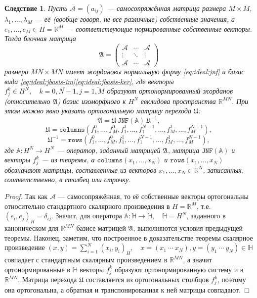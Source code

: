 \documentclass{article}
\newtheorem{corollary}{Следствие }
\begin{document}
 \begin{corollary}
     Пусть \( \mathcal{A} = (a_{ij}) \) --- самосопряжённая матрица размера \( M\times M \),
     \( \lambda_1, \ldots, \lambda_M \) --- её (вообще говоря, не все различные) собственные значения,
     а \( e_1, \ldots, e_M \in H=\mathbb{R}^M \) --- соответствующие нормированные собственные векторы.
     Тогда блочная матрица
     \[ \mathfrak{A} = \begin{pmatrix}
         \mathcal{A} & \cdots & \mathcal{A} \\
         \vdots & \ddots & \vdots \\
         \mathcal{A} & \cdots & \mathcal{A}
     \end{pmatrix} \]
     размера \( MN\times MN \) имеет жордановы нормальную форму \eqref{eq:ideal:jnf}
     и базис вида \eqref{eq:ideal:jbasis-im}\eqref{eq:ideal:jbasis-ker},
     где векторы \( f_j^k\in H^N,\quad k=\overline{0,N-1},j=\overline{1,M} \)
     образуют ортонормированный жорданов (относительно \( \mathfrak{A} \))
     базис изоморфного к \( H^N \) евклидова пространства \( \mathbb{R}^{MN} \).
     При этом можно явно указать ортогональную матрицу перехода \( \mathfrak{U} \):
     \[
         \mathfrak{A} = \mathfrak{U} ~ \mathtt{JNF}(\mathbb{A}) ~ \mathfrak{U}^{-1}, \]
    \[ \mathfrak{U} = \mathtt{columns}(f_1^0,\ldots,f_M^0,f_1^1,\ldots,f_1^{N-1},\ldots,f_M^1,\ldots,f_M^{N-1}), \]
    \[ \mathfrak{U}^{-1} = \mathtt{rows}(f_1^0,\ldots,f_M^0,f_1^1,\ldots,f_1^{N-1},\ldots,f_M^1,\ldots,f_M^{N-1}), \]
     где \( \mathbb{A}:H^N\to H^N \) --- оператор, заданный матрицей \( \mathfrak{A} \),
     матрица \( \mathtt{JNF(\mathbb{A})} \) и векторы \( f_j^k \) --- из теоремы,
     а \( \mathtt{columns}(x_1,\ldots,x_N) \) и \( \mathtt{rows}(x_1,\ldots,x_N) \) обозначают матрицы,
     составленные из векторов \( x_1, \ldots, x_N \in \mathbb{R}^N \),
     записанных, соответственно, в столбец или строчку.
 \end{corollary}
 \begin{proof}
     Так как \( \mathcal{A} \) --- самосопряжённая,
     то её собственные векторы ортогональны относительно стандартного скалярного произведения в \( H=\mathbb{R}^M \),
     т.е. \( (e_i, e_j)_H = \delta_{ij} \).
     Значит, для оператора \( \mathbb{A}:\mathbb{H}\to\mathbb{H}, \quad \mathbb{H}=H^N \),
     заданного в каноническом для \( \mathbb{R}^{MN} \) базисе матрицей \( \mathfrak{A} \),
     выполняются условия предыдущей теоремы.
     Наконец, заметим, что построенное в доказательстве теоремы
     скалярное произведение \( (x,y) = \sum_{i=1}^N (x_i, y_i)_H, \quad x=(x_1~\cdots~x_N),y=(y_1~\cdots~y_N)\in\mathbb{H} \)
     совпадает с стандартным скалярным произведением в \( \mathbb{R}^{MN} \),
     а значит ортонормированные в \( \mathbb{H} \) векторы \( f_j^k \)
     образуют ортонормированную систему и в \( \mathbb{R}^{MN} \).
     Матрица перехода \( \mathfrak{U} \) составляется из ортогональных столбцов \( f_j^k \),
     поэтому она ортогональна, а обратная и транспонированная к ней матрицы совпадают.
 \end{proof}
\end{document}
